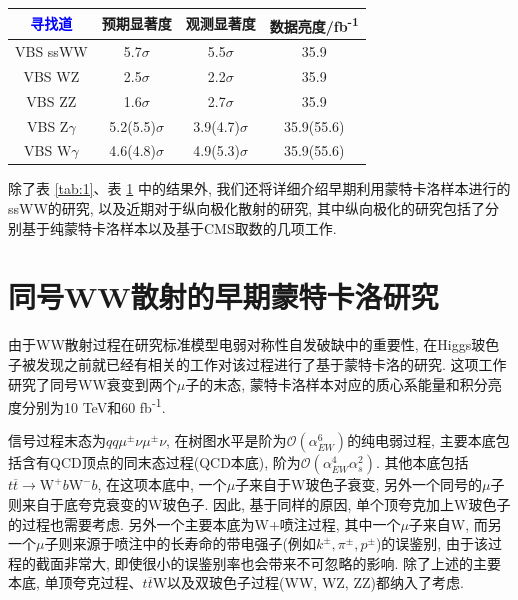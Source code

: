 \documentclass{SCIS2020cn}
\newcommand{\Wboson}{\text{W}}
\newcommand{\Zboson}{\text{Z}}
\newcommand{\add}{\textcolor{blue}}
\begin{document}
\begin{table}[!t]
\label{tab:2}
\footnotesize
\tabcolsep 39pt %
\begin{tabular*}{\textwidth}{cccc}
\toprule
\add{寻找道}& 预期显著度 & 观测显著度 &
数据亮度/fb\textsuperscript{-1} \\ \hline
VBS ssWW & 5.7$\sigma$ & 5.5$\sigma$ & 35.9\\
VBS WZ & 2.5$\sigma$ & 2.2$\sigma$ & 35.9\\
VBS ZZ & 1.6$\sigma$ & 2.7$\sigma$ & 35.9\\
VBS $\Zboson\gamma$ & 5.2(5.5)$\sigma$ & 3.9(4.7)$\sigma$ & 35.9(55.6)\\
VBS $\Wboson\gamma$ & 4.6(4.8)$\sigma$ & 4.9(5.3)$\sigma$ & 35.9(55.6)\\
\bottomrule
\end{tabular*}
\end{table}

除了表 \ref{tab:1}、表 \ref{tab:2} 中的结果外, 我们还将详细介绍早期利用蒙特卡洛样本进行的ssWW的研究, 以及近期对于纵向极化散射的研究, 其中纵向极化的研究包括了分别基于纯蒙特卡洛样本以及基于CMS取数的几项工作. 

\section{同号WW散射的早期蒙特卡洛研究}

由于WW散射过程在研究标准模型电弱对称性自发破缺中的重要性, 在Higgs玻色子被发现之前就已经有相关的工作对该过程进行了基于蒙特卡洛的研究. 这项工作研究了同号WW衰变到两个$\mu$子的末态, 蒙特卡洛样本对应的质心系能量和积分亮度分别为10 TeV和60 fb\textsuperscript{-1}. 

信号过程末态为$qq\mu^{\pm}\nu\mu^{\pm}\nu$, 在树图水平是阶为$\mathcal{O}(\alpha^6_{EW})$的纯电弱过程, 主要本底包括含有QCD顶点的同末态过程(QCD本底), 阶为$\mathcal{O}(\alpha^4_{EW}\alpha^2_s)$. 其他本底包括$t\overline{t} \rightarrow \Wboson^+b\Wboson^-b$, 在这项本底中, 一个$\mu$子来自于W玻色子衰变, 另外一个同号的$\mu$子则来自于底夸克衰变的W玻色子. 因此, 基于同样的原因, 单个顶夸克加上W玻色子的过程也需要考虑. 另外一个主要本底为W+喷注过程, 其中一个$\mu$子来自W, 而另一个$\mu$子则来源于喷注中的长寿命的带电强子(例如$k^{\pm},\pi^{\pm},p^{\pm}$)的误鉴别, 由于该过程的截面非常大, 即使很小的误鉴别率也会带来不可忽略的影响. 除了上述的主要本底, 单顶夸克过程、$t\overline{t}\Wboson$以及双玻色子过程(WW, WZ, ZZ)都纳入了考虑. 
\end{document}
